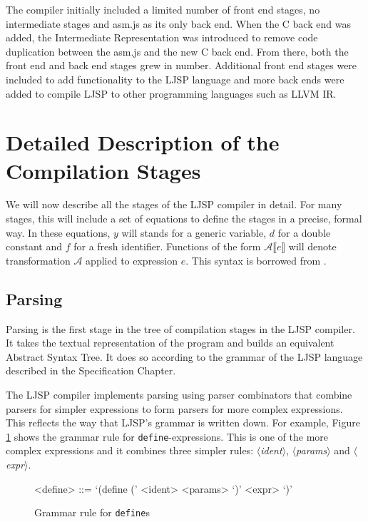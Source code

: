 \documentclass[11pt]{report}
\begin{document}
The compiler initially included a limited number of front end stages, no intermediate stages and asm.js as its only back end. When the C back end was added, the Intermediate Representation was introduced to remove code duplication between the asm.js and the new C back end. From there, both the front end and back end stages grew in number. Additional front end stages were included to add functionality to the LJSP language and more back ends were added to compile LJSP to other programming languages such as LLVM IR. 

\section{Detailed Description of the Compilation Stages}
We will now describe all the stages of the LJSP compiler in detail. For many stages, this will include a set of equations to define the stages in a precise, formal way. In these equations, $y$ will stands for a generic variable, $d$ for a double constant and $f$ for a fresh identifier. Functions of the form $\mathcal{A}\llbracket e \rrbracket$ will denote transformation $\mathcal{A}$ applied to expression $e$. This syntax is borrowed from \cite{sysftal}.

\subsection{Parsing}
Parsing is the first stage in the tree of compilation stages in the LJSP compiler. It takes the textual representation of the program and builds an equivalent Abstract Syntax Tree. It does so according to the grammar of the LJSP language described in the Specification Chapter.

The LJSP compiler implements parsing using parser combinators that combine parsers for simpler expressions to form parsers for more complex expressions. This reflects the way that LJSP's grammar is written down. For example, Figure \ref{grammardefine} shows the grammar rule for \texttt{define}-expressions. This is one of the more complex expressions and it combines three simpler rules: \textit{$\langle$ident$\rangle$}, \textit{$\langle$params$\rangle$} and \textit{$\langle$expr$\rangle$}.
\begin{figure}[ht]
\begin{grammar}
<define> ::= `(define (' <ident> <params> `)' <expr> `)'
\end{grammar}
\caption{Grammar rule for \texttt{define}s}
\label{grammardefine}
\end{figure}
\end{document}
